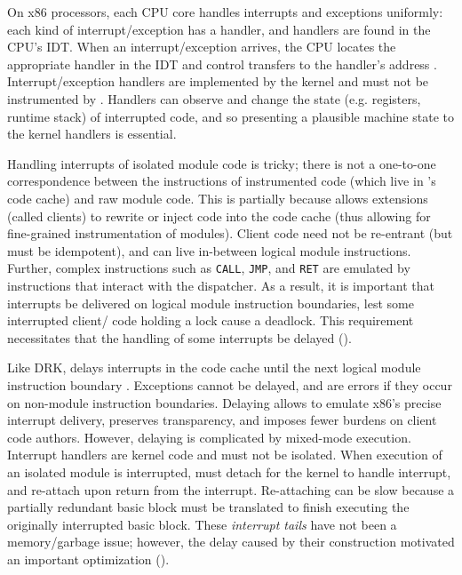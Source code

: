 \documentclass[10pt,preprint]{sigplanconf}
\begin{document}
On x86 processors, each CPU core handles interrupts and exceptions uniformly: each kind of interrupt/exception has a handler, and handlers are found in the CPU's IDT. When an interrupt/exception arrives, the CPU locates the appropriate handler in the IDT and control transfers to the handler's address \cite{IntelVolume1}. Interrupt/exception handlers are implemented by the kernel and must not be instrumented by {\sysname}. Handlers can observe and change the state (e.g. registers, runtime stack) of interrupted code, and so presenting a plausible machine state to the kernel handlers is essential.

Handling interrupts of isolated module code is tricky; there is not a one-to-one correspondence between the instructions of instrumented code (which live in {\sysname}'s code cache) and raw module code. This is partially because {\Sysname} allows extensions (called clients) to rewrite or inject code into the code cache (thus allowing for fine-grained instrumentation of modules). Client code need not be re-entrant (but must be idempotent), and can live in-between logical module instructions. Further, complex instructions such as \texttt{CALL}, \texttt{JMP}, and \texttt{RET} are emulated by instructions that interact with the dispatcher. As a result, it is important that interrupts be delivered on logical module instruction boundaries, lest some interrupted client/{\sysname} code holding a lock cause a deadlock. This requirement necessitates that the handling of some interrupts be delayed ().

Like DRK, {\sysname} delays interrupts in the code cache until the next logical module instruction boundary \cite{Feiner2012}. Exceptions cannot be delayed, and are errors if they occur on non-module instruction boundaries. Delaying allows {\sysname} to emulate x86's precise interrupt delivery, preserves transparency, and imposes fewer burdens on client code authors. However, delaying is complicated by mixed-mode execution. Interrupt handlers are kernel code and must not be isolated. When execution of an isolated module is interrupted, {\sysname} must detach for the kernel to handle interrupt, and re-attach upon return from the interrupt. Re-attaching can be slow because a partially redundant basic block must be translated to finish executing the originally interrupted basic block. These \emph{interrupt tails} have not been a memory/garbage issue; however, the delay caused by their construction motivated an important optimization ().
\end{document}
